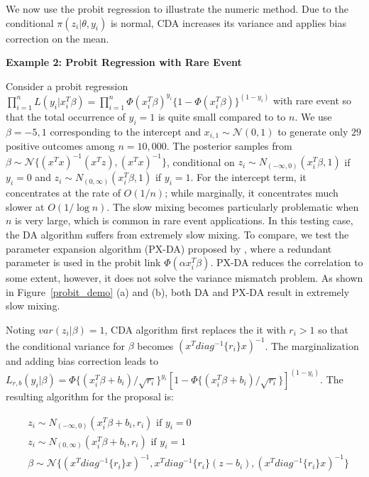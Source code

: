 \documentclass[10pt]{article}
\newcommand{\xbeta}{ x_i^T \beta}
\begin{document}
We now use the probit regression to illustrate the numeric method. Due to the conditional $\pi(z_i | \theta,y_i)$ is normal, CDA increases its variance and applies bias correction on the mean.

 {\bf Example 2: Probit Regression with Rare Event}

 
Consider a probit regression $\prod_{i=1}^{n}L(y_i|\xbeta)= \prod_{i=1}^n \Phi(\xbeta)^{y_i} \{ 1-\Phi(\xbeta) \} ^{(1-y_i)}$ with rare event so that the total occurrence of $y_i=1$ is quite small compared to to $n$. We use $\beta={-5,1}$ corresponding to the intercept and $x_{i,1}\sim \mathcal{N}(0,1)$ to generate only $29$ positive outcomes among $n=10,000$. The posterior samples from $\beta \sim \mathcal{N} \{   (x^Tx)^{-1}(x^Tz),(x^Tx)^{-1} \}$, conditional on $z_i \sim N_{(-\infty,0)}(\xbeta,1)$ if $y_i=0$ and $z_i \sim N_{(0,\infty)}(\xbeta,1)$ if $y_i=1$. For the intercept term, it concentrates at the rate of $O(1/n)$; while marginally, it concentrates much slower at $O(1/\log n)$. The slow mixing becomes particularly problematic when $n$ is very large, which is common in rare event applications. In this testing case, the \cite{albert1993bayesian} DA algorithm suffers from extremely slow mixing. To compare, we test the parameter expansion algorithm (PX-DA) proposed by \cite{liu1999parameter}, where a redundant parameter is used in the probit link $\Phi(\alpha\xbeta)$. PX-DA reduces the correlation to some extent, however, it does not solve the variance mismatch problem. As shown in Figure~\ref{probit_demo} (a) and (b), both DA and PX-DA result in extremely slow mixing.

Noting $var(z_i| \beta)=1$, CDA algorithm first replaces the it with $r_i > 1$ so that the conditional variance for $\beta$ becomes $(x^T diag^{-1}\{r_i\} x)^{-1}$. The marginalization and adding bias correction leads to $L_{r,b}(y_i|\beta)= \Phi\{  (\xbeta+ b_i)/\sqrt{r_i}  \}^{y_i} [ 1-\Phi\{  (\xbeta+ b_i)/\sqrt{r_i}  \} ] ^{(1-y_i)}$. The resulting algorithm for the proposal is:
 
\begin{equation}\begin{aligned}
&	  z_i \sim N_{(-\infty,0)}(\xbeta+b_i,r_i) \text{ if $y_i=0$ } \\
&	  z_i \sim N_{(0,\infty)}(\xbeta+b_i,r_i) \text{ if $y_i=1$}\\
&    \beta \sim \mathcal{N} \{   (x^T diag^{-1}\{r_i\}x)^{-1},  x^T diag^{-1}\{r_i\}(z-b_i),(x^T  diag^{-1}\{r_i\} x)^{-1} \} 
\end{aligned}\end{equation}
\end{document}
